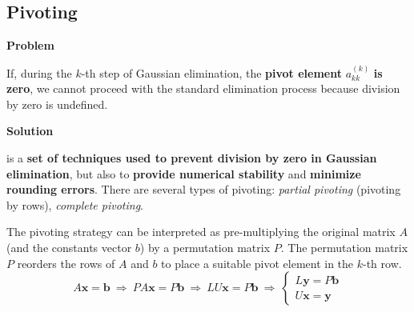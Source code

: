 \subsection{Pivoting}

\begin{flushleft}
    \textcolor{Red2}{ \textbf{Problem}}
\end{flushleft}
If, during the $k$-th step of Gaussian elimination, the \textbf{pivot element} $a_{kk}^{(k)}$ \textbf{is zero}, we cannot proceed with the standard elimination process because division by zero is undefined.

\highspace
\begin{flushleft}
    \textcolor{Green3}{ \textbf{Solution}}
\end{flushleft}
 is a \textbf{set of techniques used to prevent division by zero in Gaussian elimination}, but also to \textbf{provide numerical stability} and \textbf{minimize rounding errors}. There are several types of pivoting: \emph{partial pivoting} (pivoting by rows), \emph{complete pivoting}.

\highspace
The pivoting strategy can be interpreted as pre-multiplying the original matrix $A$ (and the constants vector $b$) by a permutation matrix $P$. The permutation matrix $P$ reorders the rows of $A$ and $b$ to place a suitable pivot element in the $k$-th row.
\begin{equation*}
    A\mathbf{x} = \mathbf{b} \: \Rightarrow \: PA\mathbf{x} = P\mathbf{b} \: \Rightarrow \: LU\mathbf{x} = P\mathbf{b} \: \Rightarrow \: \begin{cases}
        L\mathbf{y} = P\mathbf{b} \\
        U\mathbf{x} = \mathbf{y}
    \end{cases}
\end{equation*}